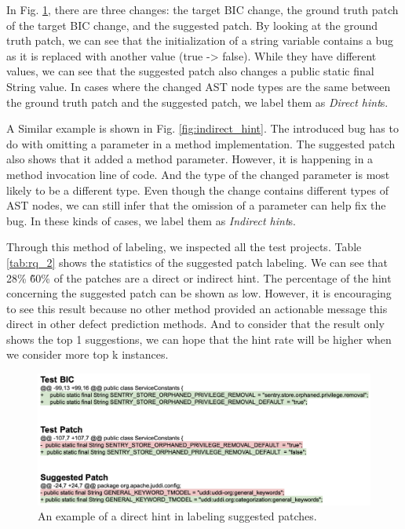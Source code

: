 In Fig. \ref{fig:direct_hint}, there are three changes: the target BIC change, the ground truth patch of the target BIC change, and the suggested patch. 
By looking at the ground truth patch, we can see that the initialization of a string variable contains a bug as it is replaced with another value (true -> false).
While they have different values, we can see that the suggested patch also changes a public static final String value.
In cases where the changed AST node types are the same between the ground truth patch and the suggested patch, we label them as \emph{Direct hint}s.

A Similar example is shown in Fig. \ref{fig:indirect_hint}.
The introduced bug has to do with omitting a parameter in a method implementation.
The suggested patch also shows that it added a method parameter.
However, it is happening in a method invocation line of code.
And the type of the changed parameter is most likely to be a different type.
Even though the change contains different types of AST nodes, we can still infer that the omission of a parameter can help fix the bug.
In these kinds of cases, we label them as \emph{Indirect hint}s.

Through this method of labeling, we inspected all the test projects.
Table \ref{tab:rq_2} shows the statistics of the suggested patch labeling.
We can see that 28\% \~ 60\% of the patches are a direct or indirect hint.
The percentage of the hint concerning the suggested patch can be shown as low.
However, it is encouraging to see this result because no other method provided an actionable message this direct in other defect prediction methods.
And to consider that the result only shows the top 1 suggestions, we can hope that the hint rate will be higher when we consider more top k instances.

\begin{figure}[!tbp]
\renewcommand{\arraystretch}{1}
    \centering
    \includegraphics[width=\textwidth]{figures/direct_hint.png}\hfill
    \caption{An example of a direct hint in labeling suggested patches.}
    \label{fig:direct_hint}
\end{figure}

